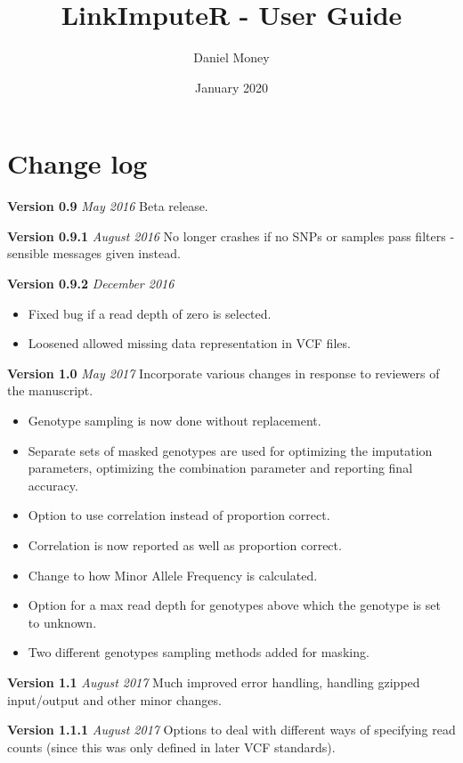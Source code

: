 \documentclass[10pt]{report}
\title{LinkImputeR - User Guide}
\author{Daniel Money}
\date{January 2020}
\begin{document}
\setcounter{tocdepth}{1}
\maketitle
\tableofcontents

\section{Change log}

\textbf{Version 0.9} \textit{May 2016} Beta release.

\textbf{Version 0.9.1} \textit{August 2016} No longer crashes if no SNPs or samples pass filters - sensible messages given instead.

\textbf{Version 0.9.2} \textit{December 2016}
\begin{itemize}
    \item Fixed bug if a read depth of zero is selected.
    \item Loosened allowed missing data representation in VCF files.
\end{itemize}

\textbf{Version 1.0} \textit{May 2017} Incorporate various changes in response to reviewers of the manuscript.
\begin{itemize}
	\item Genotype sampling is now done without replacement.
	\item Separate sets of masked genotypes are used for optimizing the imputation parameters, optimizing the combination parameter and reporting final accuracy.
	\item Option to use correlation instead of proportion correct.
	\item Correlation is now reported as well as proportion correct.
	\item Change to how Minor Allele Frequency is calculated.
	\item Option for a max read depth for genotypes above which the genotype is set to unknown.
	\item Two different genotypes sampling methods added for masking.
\end{itemize}

\textbf{Version 1.1} \textit{August 2017} Much improved error handling, handling gzipped input/output and other minor changes.

\textbf{Version 1.1.1} \textit{August 2017} Options to deal with different ways of specifying read counts (since this was only defined in later VCF standards).
\end{document}
